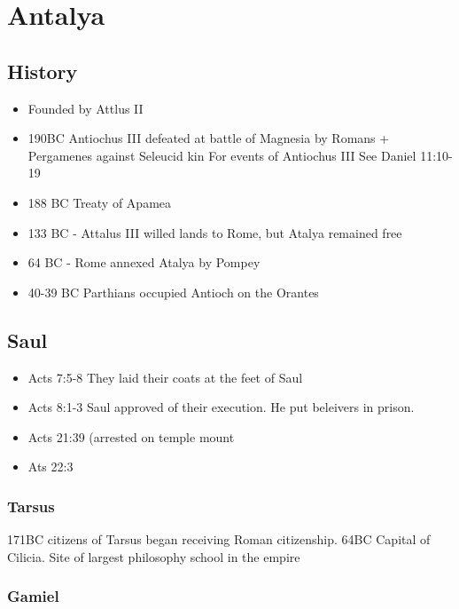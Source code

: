 \documentclass[
]{book}
\providecommand{\tightlist}{%
  \setlength{\itemsep}{0pt}\setlength{\parskip}{0pt}}
\begin{document}
\hypertarget{antalya}{%
\chapter{Antalya}\label{antalya}}

\hypertarget{history}{%
\section{History}\label{history}}

\begin{itemize}
\tightlist
\item
  Founded by Attlus II
\item
  190BC Antiochus III defeated at battle of Magnesia by Romans + Pergamenes against Seleucid kin
  For events of Antiochus III See Daniel 11:10-19
\item
  188 BC Treaty of Apamea
\item
  133 BC - Attalus III willed lands to Rome, but Atalya remained free
\item
  64 BC - Rome annexed Atalya by Pompey
\item
  40-39 BC Parthians occupied Antioch on the Orantes
\end{itemize}

\hypertarget{saul}{%
\section{Saul}\label{saul}}

\begin{itemize}
\tightlist
\item
  Acts 7:5-8 They laid their coats at the feet of Saul
\item
  Acts 8:1-3 Saul approved of their execution. He put beleivers in prison.
\item
  Acts 21:39 (arrested on temple mount
\item
  Ats 22:3
\end{itemize}

\hypertarget{tarsus}{%
\subsection{Tarsus}\label{tarsus}}

171BC citizens of Tarsus began receiving Roman citizenship. 64BC Capital of Cilicia. Site of largest philosophy school in the empire

\hypertarget{gamiel}{%
\subsection{Gamiel}\label{gamiel}}
\end{document}
